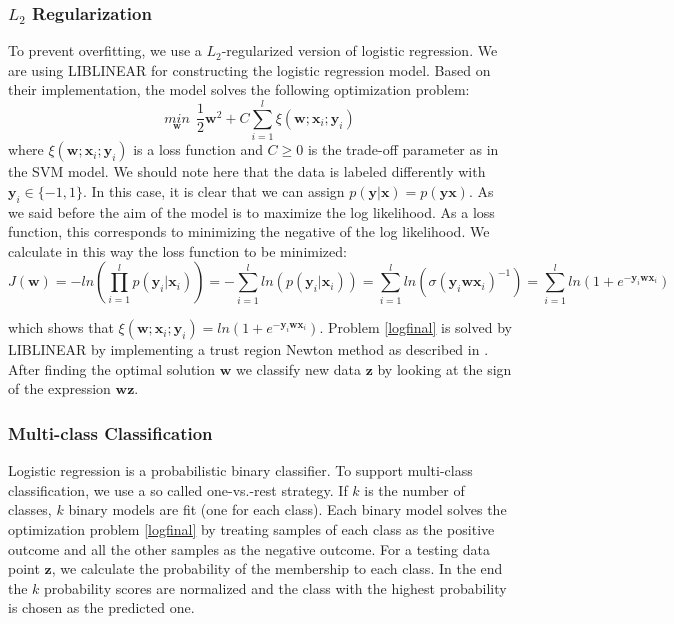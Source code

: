 \documentclass[a4paper,11pt,oneside]{article}
\begin{document}
\subsubsection*{$L_2$ Regularization}
To prevent overfitting, we use a $L_2$-regularized version of logistic regression. We are using LIBLINEAR \cite{fan2008liblinear}
for constructing the logistic regression model. Based on their implementation, the model solves the following optimization problem:
\begin{equation}\label{logfinal}
  \underset{\mathbf{w}}{min} \ \ \frac{1}{2}\mathbf{w}^2+C\sum_{i=1}^l\xi(\mathbf{w};\mathbf{x}_i;\mathbf{y}_i)
\end{equation}
where $\xi(\mathbf{w};\mathbf{x}_i;\mathbf{y}_i)$ is a loss function and $C\geq 0$ is the trade-off parameter
as in the SVM model. We should note here that the data is labeled differently with $\mathbf{y}_i \in \{-1,1\}$.
In this case, it is clear that we can assign $p(\mathbf{y}|\mathbf{x}) = p(\mathbf{y}\mathbf{x})$. 
As we said before the aim of the model is to maximize the log likelihood. As a loss function, this corresponds
to minimizing the negative of the log likelihood. We calculate in this way the loss function to be minimized:
\begin{equation}
  J(\mathbf{w}) = -ln(\prod_{i=1}^l p(\mathbf{y}_i|\mathbf{x}_i)) = - \sum_{i=1}^l ln(p(\mathbf{y}_i|\mathbf{x}_i))
  = \sum_{i=1}^l ln(\sigma(\mathbf{y}_i\mathbf{w}\mathbf{x}_i)^{-1}) = \sum_{i=1}^l ln(1+e^{-\mathbf{y}_i\mathbf{w}\mathbf{x}_i})
\end{equation}

which shows that $\xi(\mathbf{w};\mathbf{x}_i;\mathbf{y}_i) = ln(1+e^{-\mathbf{y}_i\mathbf{w}\mathbf{x}_i})$.
Problem \ref{logfinal} is solved by LIBLINEAR by implementing a trust region Newton method as described in \cite{lin2008trust}.
After finding the optimal solution $\mathbf{w}$ we classify new data $\mathbf{z}$ by looking at the sign of the
expression $\mathbf{w}\mathbf{z}$.
\subsubsection*{Multi-class Classification}
Logistic regression is a probabilistic binary classifier. To support multi-class classification, we use 
a so called one-vs.-rest strategy. If $k$ is the number of classes, $k$ binary models are fit (one for each class).
Each binary model solves the optimization problem \ref{logfinal} by treating samples of each class as the positive 
outcome and all the other samples as the negative outcome. For a testing data point $\mathbf{z}$, we calculate
the probability of the membership to each class. In the end the $k$ probability scores are normalized and the 
class with the highest probability is chosen as the predicted one. 
\end{document}
